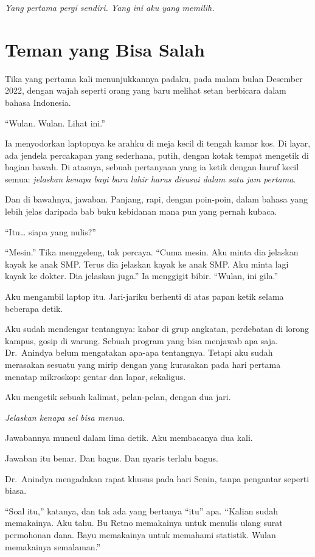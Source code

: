 \documentclass[11pt,twoside,openany]{book}
\makeatletter
\newcommand{\scenebreak}{\par\vspace{0.9em}{\centering\textsc{*\hspace{0.7em}*\hspace{0.7em}*}\par}\vspace{0.9em}\@afterindentfalse\@afterheading}
\makeatother
\begin{document}
\emph{Yang pertama pergi sendiri. Yang ini aku yang memilih.}

\chapter{Teman yang Bisa Salah}
Tika yang pertama kali menunjukkannya padaku, pada malam bulan Desember 2022, dengan wajah seperti orang yang baru melihat setan berbicara dalam bahasa Indonesia.

``Wulan. Wulan. Lihat ini.''

Ia menyodorkan laptopnya ke arahku di meja kecil di tengah kamar kos. Di layar, ada jendela percakapan yang sederhana, putih, dengan kotak tempat mengetik di bagian bawah. Di atasnya, sebuah pertanyaan yang ia ketik dengan huruf kecil semua: \emph{jelaskan kenapa bayi baru lahir harus disusui dalam satu jam pertama}.

Dan di bawahnya, jawaban. Panjang, rapi, dengan poin-poin, dalam bahasa yang lebih jelas daripada bab buku kebidanan mana pun yang pernah kubaca.

``Itu\ldots{} siapa yang nulis?''

``Mesin.'' Tika menggeleng, tak percaya. ``Cuma mesin. Aku minta dia jelaskan kayak ke anak SMP. Terus dia jelaskan kayak ke anak SMP. Aku minta lagi kayak ke dokter. Dia jelaskan juga.'' Ia menggigit bibir. ``Wulan, ini gila.''

Aku mengambil laptop itu. Jari-jariku berhenti di atas papan ketik selama beberapa detik.

Aku sudah mendengar tentangnya: kabar di grup angkatan, perdebatan di lorong kampus, gosip di warung. Sebuah program yang bisa menjawab apa saja. Dr.~Anindya belum mengatakan apa-apa tentangnya. Tetapi aku sudah merasakan sesuatu yang mirip dengan yang kurasakan pada hari pertama menatap mikroskop: gentar dan lapar, sekaligus.

Aku mengetik sebuah kalimat, pelan-pelan, dengan dua jari.

\emph{Jelaskan kenapa sel bisa menua.}

Jawabannya muncul dalam lima detik. Aku membacanya dua kali.

Jawaban itu benar. Dan bagus. Dan nyaris terlalu bagus.

\scenebreak
Dr.~Anindya mengadakan rapat khusus pada hari Senin, tanpa pengantar seperti biasa.

``Soal itu,'' katanya, dan tak ada yang bertanya ``itu'' apa. ``Kalian sudah memakainya. Aku tahu. Bu Retno memakainya untuk menulis ulang surat permohonan dana. Bayu memakainya untuk memahami statistik. Wulan memakainya semalaman.''
\end{document}
